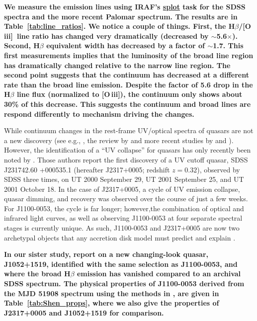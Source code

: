 \documentclass[a4paper,fleqn,usenatbib]{mnras}
\begin{document}
{\bf
We measure the emission lines using IRAF's
\href{http://stsdas.stsci.edu/cgi-bin/gethelp.cgi?splot.hlp}{splot}
task for the SDSS spectra and the more recent Palomar
spectrum. The results are in Table~\ref{tab:line_ratios}. 
We notice a couple of things.  First, the H$\beta$/[O\,{\sc
iii}]\ line ratio has changed very dramatically (decreased by
$\sim$5.6$\times$).  Second, H$\beta$ equivalent width has decreased
by a factor of $\sim$1.7.
This first measurements implies that the luminosity of the broad line
region has dramatically changed relative to the narrow line region.
The second point suggests that the continuum has decreased at a
different rate than the broad line emission. Despite the factor of 5.6
drop in the H$\beta$ line flux (normalized to [O\,{\sc iii}]), the
continuum only shows about 30\% of this decrease.  This suggests the
continuum and broad lines are respond differently to mechanism driving
the changes. }

While continuum changes in the rest-frame UV/optical spectra of
quasars are not a new discovery (see e.g., \citealt{Clavel1991}, the
review by \citealt{Ulrich1997} and more recent studies by
\citealt{VandenBerk2004, Pereyra2006, MacLeod2010} and
\citealt{Guo2016b}). However, the identification of a ``UV collapse''
for quasars has only recently been noted by \cite{Guo2016}.  Those
authors report the first discovery of a UV cutoff quasar, SDSS
J231742.60 +000535.1 (hereafter J2317+0005; redshift $z = 0.32$),
observed by SDSS three times, on UT 2000 September 29, UT 2001
September 25, and UT 2001 October 18. In the case of J2317+0005, a
cycle of UV emission collapse, quasar dimming, and recovery was
observed over the course of just a few weeks. For J1100-0053, the
cycle is far longer; however,the combination of optical and infrared
light curves, as well as observing J1100-0053 at four separate
spectral stages is currently unique. As such, J1100-0053 and
J2317+0005 are now two archetypal objects that any accretion disk
model must predict and explain \citep[e.g.,][]{Lawrence2018}.

{\bf In our sister study, \citet{Stern2018} report on a new
changing-look quasar, J1052+1519, identified with the same selection
as J1100-0053, and where the broad H$\beta$ emission has vanished
compared to an archival SDSS spectrum. The physical properties of
J1100-0053 derived from the MJD 51908 spectrum using the methods in
\citet{Shen2011}, are given in Table~\ref{tab:Shen_props}, where we
also give the properties of J2317+0005 \citep{Guo2016} and J1052+1519
\citep{Stern2018} for comparison.}
\end{document}
